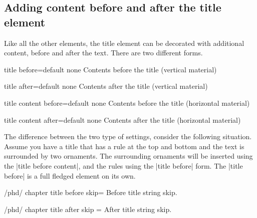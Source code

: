 \subsection*{Adding content before and after the title element}

Like all the other elements, the title element can be decorated with additional content,
before and after the text. There are two different forms. 

\begin{docKey}[phd]{title before}{=}{default none}
Contents before the title (vertical material)
\end{docKey}

\begin{docKey}[phd]{title after}{=}{default none}
Contents after the title (vertical material)
\end{docKey}

\begin{docKey}[phd]{title content before}{=}{default none}
Contents before the title (horizontal material)
\end{docKey}

\begin{docKey}[phd]{title content after}{=}{default none}
Contents after the title (horizontal material)
\end{docKey}

The difference between the two type of settings, consider the following situation. Assume you have a title that has a rule at the top and bottom and the text is surrounded by two ornaments. The surrounding ornaments will be inserted using the |title before content|, and the rules using the |title before| form. The |title before| is a full fledged element on its own. 

%
%



 
\begin{docKey}{/phd/ chapter title before skip}{= }{}
Before title string skip.
\end{docKey}

\begin{docKey}{/phd/ chapter title after skip}{ =  }{}
After title string skip.
\end{docKey}

